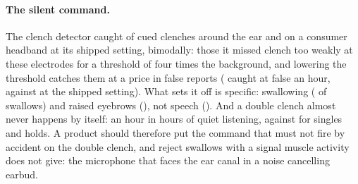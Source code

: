 \paragraph{The silent command.} The clench detector caught \clAround{} of cued clenches around the ear and \clHeadband{} on a consumer headband at its shipped setting, bimodally: those it missed clench too weakly at these electrodes for a threshold of four times the background, and lowering the threshold catches them at a price in false reports (\clAroundThree{} caught at \clAroundThreeFalse{} false an hour, against \clAroundFourFalse{} at the shipped setting). What sets it off is specific: swallowing (\clSwallow{} of swallows) and raised eyebrows (\clBrows{}), not speech (\clTongue{}). And a double clench almost never happens by itself: \clListenDouble{} an hour in \clListenHours{} hours of quiet listening, against \clListenOthers{} for singles and holds. A product should therefore put the command that must not fire by accident on the double clench, and reject swallows with a signal muscle activity does not give: the microphone that faces the ear canal in a noise cancelling earbud.
